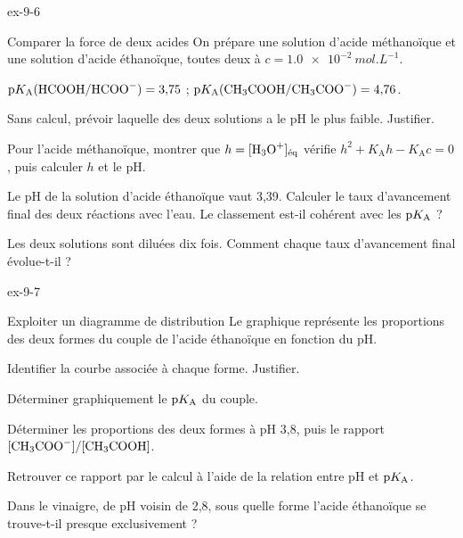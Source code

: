 \begin{blocLivre}{ex-9-6}
\begin{exercice}[2]{Comparer la force de deux acides}
On prépare une solution d'acide méthanoïque et une solution d'acide éthanoïque, toutes deux à
$c=\qty{1,0e-2}{mol.L^{-1}}$.
\begin{donnees}
$\pKa(\ce{HCOOH}/\ce{HCOO-})=3{,}75$ ; $\pKa(\ce{CH3COOH}/\ce{CH3COO-})=4{,}76$.
\end{donnees}
\begin{questions}
\item Sans calcul, prévoir laquelle des deux solutions a le pH le plus faible. Justifier.
\item {}Pour l'acide méthanoïque, montrer que $h=[\ce{H3O+}]_\text{éq}$ vérifie
$h^2+K_\mathrm{A}h-K_\mathrm{A}c=0$, puis calculer $h$ et le pH.
\item Le pH de la solution d'acide éthanoïque vaut 3,39. Calculer le taux d'avancement final des deux réactions avec
l'eau. Le classement est-il cohérent avec les $\mathrm{p}K_{\mathrm{A}}$ ?
\item Les deux solutions sont diluées dix fois. Comment chaque taux d'avancement final évolue-t-il ?
\end{questions}
\end{exercice}
\end{blocLivre}
\begin{blocLivre}{ex-9-7}
\begin{exercice}[2]{Exploiter un diagramme de distribution}
Le graphique représente les proportions des deux formes du couple de l'acide éthanoïque en fonction du pH.
\begin{questions}
\item Identifier la courbe associée à chaque forme. Justifier.
\item Déterminer graphiquement le $\mathrm{p}K_{\mathrm{A}}$ du couple.
\item Déterminer les proportions des deux formes à pH 3,8, puis le rapport $[\ce{CH3COO-}]/[\ce{CH3COOH}]$.
\item Retrouver ce rapport par le calcul à l'aide de la relation entre pH et $\mathrm{p}K_{\mathrm{A}}$.
\item Dans le vinaigre, de pH voisin de 2,8, sous quelle forme l'acide éthanoïque se trouve-t-il presque
exclusivement ?
\end{questions}
\end{exercice}
\end{blocLivre}
